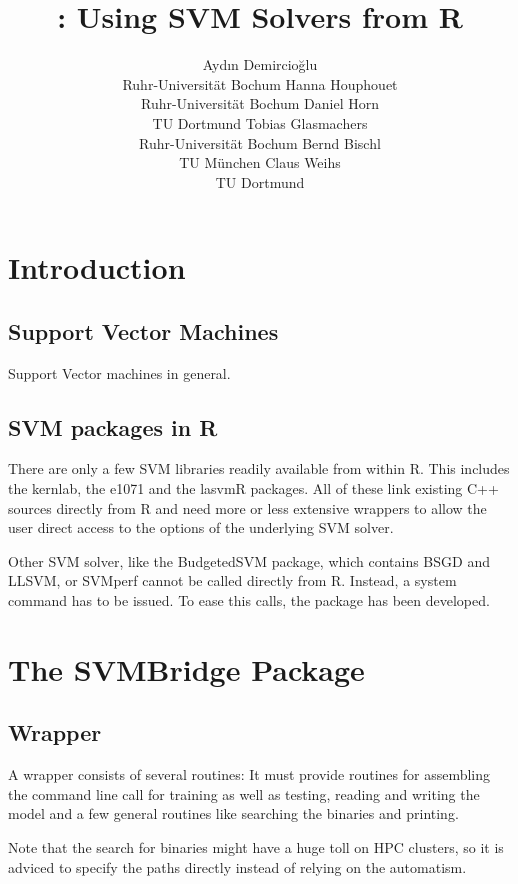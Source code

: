 \documentclass[article]{jss}
\author{Ayd\i n Demircio\u{g}lu\\Ruhr-Universit\"at Bochum \And 
Hanna Houphouet\\Ruhr-Universit\"at Bochum \And 
        Daniel Horn\\TU Dortmund \AND
        Tobias Glasmachers\\Ruhr-Universit\"at Bochum \And 
        Bernd Bischl\\TU M\"unchen \And 
        Claus Weihs\\TU Dortmund}
\title{\pkg{SVMBridge}: Using SVM Solvers from R}
\begin{document}


\section{Introduction}

\subsection{Support Vector Machines}

Support Vector machines in general.


\subsection{SVM packages in R}

There are only a few SVM libraries readily available from within R.
This includes the kernlab, the e1071 and the lasvmR packages.
All of these link existing C++ sources directly from R and need
more or less extensive wrappers to allow the user direct access to
the options of the underlying SVM solver.

Other SVM solver, like the BudgetedSVM package, which contains
BSGD and LLSVM, or SVMperf cannot be called directly from R.
Instead, a system command has to be issued.
To ease this calls, the  package has been developed.



\section{The SVMBridge Package}

\subsection{Wrapper}

A wrapper consists of several routines: It must provide routines
for assembling the command line call for training as well as testing,
reading and writing the model and a few general routines like searching
the binaries and printing.

Note that the search for binaries might have a huge toll on HPC clusters,
so it is adviced to specify the paths directly instead of relying on the 
automatism.
\end{document}
